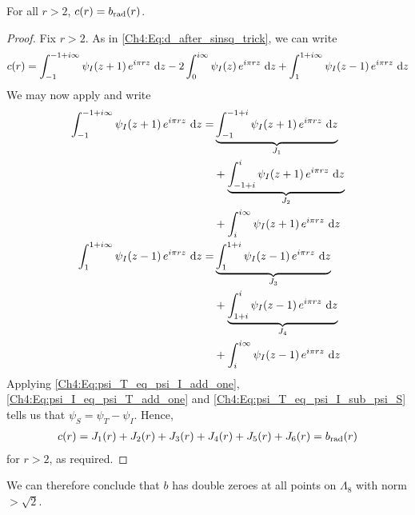 \begin{boxproposition}\label{Ch4:Prop:b_eq_c}
    For all $r > 2$, $c(r) = b_{\operatorname{rad}}(r)$.
\end{boxproposition}
\begin{proof}
    Fix $r > 2$. As in \eqref{Ch4:Eq:d_after_sinsq_trick}, we can write
    \begin{align*}
        c(r)
        = \int_{-1}^{-1 + i\infty} \psi_I\!\left( z + 1 \right) e^{i\pi r z} \, \operatorname{d}\!{z}
        - 2 \int_{0}^{i\infty} \psi_I\!\left( z \right) e^{i\pi r z} \, \operatorname{d}\!{z}
        + \int_{1}^{1 + i\infty} \psi_I\!\left( z - 1 \right) e^{i\pi r z} \, \operatorname{d}\!{z}
    \end{align*}
    We may now apply  and write
    \begin{align*}
        \int_{-1}^{-1 + i\infty} \psi_I\of{z + 1} e^{i\pi r z} \, \diff{z}
        =& \underbrace{\int_{-1}^{-1 + i} \psi_I\of{z + 1} e^{i\pi r z} \, \diff{z}}_{J_1} \\
        &+ \underbrace{\int_{-1 + i}^{i} \psi_I\of{z + 1} e^{i\pi r z} \, \diff{z}}_{J_2} \\
        &+ \int_{i}^{i\infty} \psi_I\of{z + 1} e^{i\pi r z} \, \diff{z} \\
        \int_{1}^{1 + i\infty} \psi_I\of{z - 1} e^{i\pi r z} \, \diff{z}
        =& \underbrace{\int_{1}^{1 + i}\psi_I\of{z - 1} e^{i\pi r z} \, \diff{z}}_{J_3} \\
        &+ \underbrace{\int_{1 + i}^{i} \psi_I\of{z - 1} e^{i\pi r z} \, \diff{z}}_{J_4} \\
        &+ \int_{i}^{i\infty}\psi_I\of{z - 1} e^{i\pi r z} \, \diff{z}
    \end{align*}
    Applying \eqref{Ch4:Eq:psi_T_eq_psi_I_add_one}, \eqref{Ch4:Eq:psi_I_eq_psi_T_add_one} and \eqref{Ch4:Eq:psi_T_eq_psi_I_sub_psi_S}
    tells us that $\psi_S = \psi_T - \psi_I$. Hence,
    \begin{align*}
        c(r) = J_1(r) + J_2(r) + J_3(r) + J_4(r) + J_5(r) + J_6(r) = b_{\operatorname{rad}}(r)
    \end{align*}
    for $r > 2$, as required.
\end{proof}

We can therefore conclude that $b$ has double zeroes at all points on $\Lambda_8$ with norm $> \sqrt{2}$.